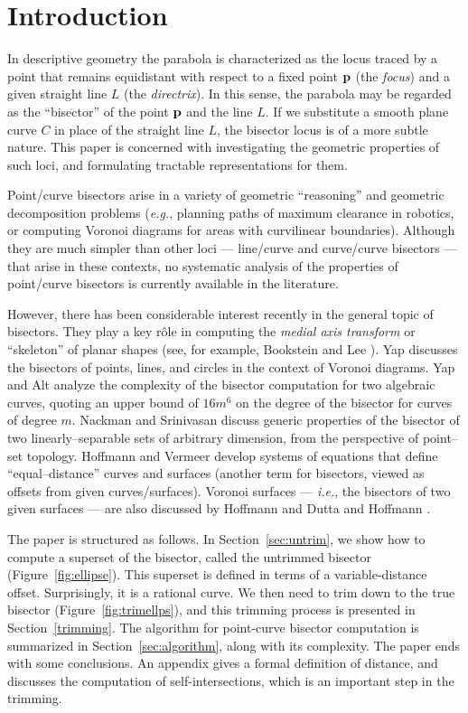 \section{Introduction}
\label{intro}

In descriptive geometry \cite{coxeter69} the parabola is
characterized as the locus traced by a point that remains
equidistant with respect to a fixed point ${\bf p}$ (the
{\it focus\/}) and a given straight line $L$ (the {\it
directrix\/}). In this sense, the parabola may be
regarded as the ``bisector'' of the point ${\bf p}$ and
the line $L$.
If we substitute a smooth plane curve $C$ in place of
the straight line $L$, the bisector locus is of a more
subtle nature. This paper is concerned with investigating
the geometric properties of such loci, and formulating
tractable representations for them. 

Point/curve bisectors
arise in a variety of geometric ``reasoning'' and geometric
decomposition problems ({\it e.g.}, planning paths of maximum
clearance in robotics, or computing Voronoi diagrams for areas
with curvilinear boundaries). Although they are much simpler
than other loci --- line/curve and curve/curve bisectors ---
that arise in these contexts, no systematic analysis of the
properties of point/curve bisectors is currently available
in the literature.

However, there has been considerable interest recently in
the general topic of bisectors. They play a key r\^ole in
computing the {\it medial axis transform\/} or ``skeleton''
of planar shapes (see, for example, Bookstein \cite{bookstein79}
and Lee \cite{lee82}). Yap \cite{yap87} discusses the bisectors
of points, lines, and circles in the context of Voronoi diagrams.
Yap and Alt \cite{yap89} analyze
the complexity of the bisector computation for two algebraic
curves, quoting an upper bound of $16m^6$ on the degree of
the bisector for curves of degree $m$. Nackman and Srinivasan
\cite{nackman91} discuss generic properties of the bisector of
two linearly--separable sets of arbitrary dimension, from the
perspective of point--set topology.
Hoffmann and Vermeer \cite{HV91} develop systems of equations
that define ``equal--distance'' curves and surfaces (another
term for bisectors, viewed as offsets from given curves/surfaces).
Voronoi surfaces --- {\it i.e.}, the bisectors of two given
surfaces --- are also discussed by Hoffmann \cite{H90} and Dutta
and Hoffmann \cite{DH90}.

The paper is structured as follows.
In Section~\ref{sec:untrim}, we show how to compute 
a superset of the bisector, called the untrimmed bisector 
(Figure~\ref{fig:ellipse}).
This superset is defined in terms of a variable-distance offset.
Surprisingly, it is a rational curve.
We then need to trim down to the true bisector (Figure~\ref{fig:trimellps}),
and this trimming process is presented in Section~\ref{trimming}.
The algorithm for point-curve bisector computation is summarized
in Section~\ref{sec:algorithm}, along with its complexity.
The paper ends with some conclusions.
An appendix gives a formal definition of distance,
and discusses the computation of 
self-intersections, which is an important step in the trimming.

